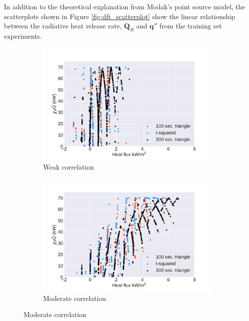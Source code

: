 \documentclass{article}
\begin{document}
In addition to the theoretical explanation from Modak's point source model, the scatterplots shown in Figure \ref{fig:dft_scatterplot} show the linear relationship between the radiative heat release rate, $\boldsymbol{\dot{Q}}_{R}$ and $\boldsymbol{q}''$ from the training set experiments. 

\begin{figure}[htbp]
  \centering
  \begin{subfigure}[t]{.45\textwidth}
      \centering
      \includegraphics[width=\textwidth,keepaspectratio]{figures/weak_dft_scatter.pdf}
      \caption{Weak correlation}
      \label{fig:weak_scatter}
  \end{subfigure}
  \begin{subfigure}[t]{.45\textwidth}
      \centering
      \includegraphics[width=\textwidth ,keepaspectratio]{figures/moderate_dft_scatter.pdf}
      \caption{Moderate correlation}

\end{subfigure}
\end{figure}
\end{document}
